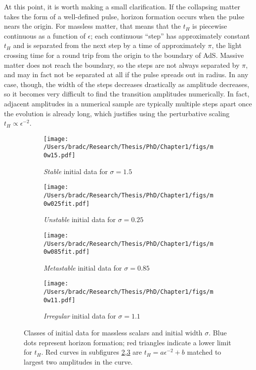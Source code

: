 \documentclass[../PhD.tex]{subfiles}
\begin{document}
At this point, it is worth making a small clarification.  If the collapsing
matter takes the form of a well-defined pulse, horizon formation occurs when
the pulse nears the origin.  For massless matter, that means that the
$t_H$ is piecewise continuous as a function of $\epsilon$;
each continuous ``step'' has approximately constant $t_H$
and is separated from the next step by a time of approximately
$\pi$, the light crossing time for a round trip from the origin to the boundary
of AdS.  Massive matter does not reach the boundary, so the steps are not
always separated by $\pi$, and may in fact not be separated at all if the pulse
spreads out in radius.  In any case, though, the width of the steps decreases
drastically as amplitude decreases, so it becomes very difficult to find
the transition amplitudes numerically.  In fact, adjacent amplitudes in a
numerical sample are typically multiple steps apart once the evolution is
already long, which justifies using the perturbative scaling
$t_H\propto \epsilon^{-2}$.


\begin{figure}[!t]
\centering
\begin{subfigure}[t]{0.47\textwidth}
\texttt{[image: /Users/bradc/Research/Thesis/PhD/Chapter1/figs/m0w15.pdf]}
\caption{\textit{Stable} initial data for $\sigma=1.5$}
\label{f:m0w15}
\end{subfigure}\hfill
\begin{subfigure}[t]{0.47\textwidth}
\texttt{[image: /Users/bradc/Research/Thesis/PhD/Chapter1/figs/m0w025fit.pdf]}
\caption{\textit{Unstable} initial data for $\sigma=0.25$}
\label{f:m0w025}
\end{subfigure}
\begin{subfigure}[t]{0.47\textwidth}
\texttt{[image: /Users/bradc/Research/Thesis/PhD/Chapter1/figs/m0w085fit.pdf]}
\caption{\textit{Metastable} initial data for $\sigma=0.85$}
\label{f:m0w085}
\end{subfigure}\hfill
\begin{subfigure}[t]{0.47\textwidth}
\texttt{[image: /Users/bradc/Research/Thesis/PhD/Chapter1/figs/m0w11.pdf]}
\caption{\textit{Irregular} initial data for $\sigma=1.1$}
\label{f:m0w11}
\end{subfigure}
\caption[Horizon formation time vs. amplitude for classes of initial data]{Classes of initial data for massless scalars and initial width
$\sigma$.  Blue dots represent horizon formation;
red triangles indicate a lower limit for $t_H$.  Red curves in subfigures
\ref{f:m0w025},\ref{f:m0w085} are $t_H=a\epsilon^{-2}+b$ matched to largest
two amplitudes in the curve.}
\label{f:classes}
\end{figure}
\end{document}
